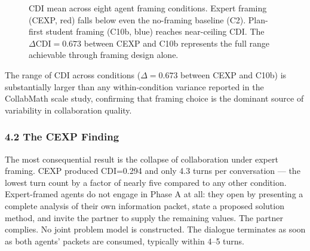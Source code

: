 \documentclass[
  11pt,
]{article}
\begin{document}
\begin{figure}[ht]
\centering
{}
\caption{CDI mean across eight agent framing conditions. Expert framing (CEXP, red) falls below even the no-framing baseline (C2). Plan-first student framing (C10b, blue) reaches near-ceiling CDI. The $\Delta\mathrm{CDI} = 0.673$ between CEXP and C10b represents the full range achievable through framing design alone.}
\label{fig:spectrum}
\end{figure}

The range of CDI across conditions ($\Delta = 0.673$ between CEXP and
C10b) is substantially larger than any within-condition variance reported
in the CollabMath scale study, confirming that framing choice is the
dominant source of variability in collaboration quality.

\subsubsection{4.2 The CEXP Finding}\label{the-cexp-finding}

The most consequential result is the collapse of collaboration under
expert framing. CEXP produced CDI=0.294 and only 4.3 turns per
conversation --- the lowest turn count by a factor of nearly five
compared to any other condition. Expert-framed agents do not engage in
Phase A at all: they open by presenting a complete analysis of their
own information packet, state a proposed solution method, and invite the
partner to supply the remaining values. The partner complies. No joint
problem model is constructed. The dialogue terminates as soon as both
agents' packets are consumed, typically within 4--5 turns.
\end{document}
